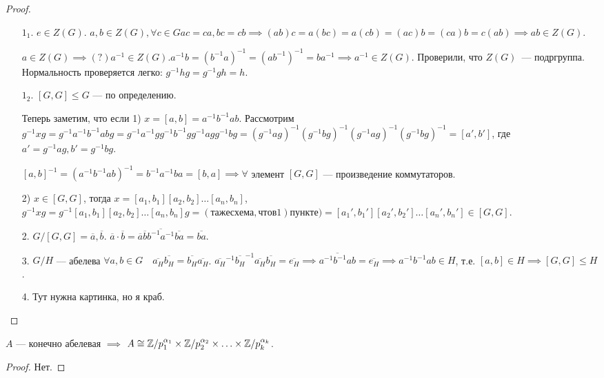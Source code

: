 \begin{proof}
    \begin{enumerate}
        \item[$1_1$.] $e \in Z(G)$.  $a, b \in Z(G), \forall c \in G ac = ca, bc = cb \implies (ab)c = a(bc) = a(cb) = (ac)b = (ca)b = c(ab) \implies ab \in Z(G)$.

            $a \in Z(G) \implies(?) a^{-1} \in Z(G). a^{-1}b = (b^{-1}a)^{-1} = (ab^{-1})^{-1} = ba^{-1} \implies a^{-1} \in Z(G)$. Проверили, что $Z(G)$~--- подргруппа. Нормальность проверяется легко: $g^{-1}hg = g^{-1}gh = h$.
        \item[$1_2$.] $[G, G] \le G$ --- по определению.

            Теперь заметим, что если 1) $x = [a, b] = a^{-1}b^{-1}ab$. Рассмотрим  $g^{-1}xg = g^{-1}a^{-1}b^{-1}abg = g^{-1}a^{-1}gg^{-1}b^{-1}gg^{-1}agg^{-1}bg = (g^{-1}ag)^{-1}(g^{-1}bg)^{-1}(g^{-1}ag)^{-1}(g^{-1}bg)^{-1} = [a', b']$, где $a' = g^{-1}ag, b' = g^{-1}bg$.

            $[a, b]^{-1} = (a^{-1}b^{-1}ab)^{-1} = b^{-1}a^{-1}ba = [b, a] \implies \forall $ элемент  $[G, G]$ --- произведение коммутаторов.

             2) $x \in [G, G]$, тогда  $x = [a_1, b_1][a_2,b_2]\ldots[a_n, b_n]$, $g^{-1}xg = g^{-1}[a_1, b_1][a_2, b_2]\ldots[a_n, b_n]g = (та же схема, что в 1) пункте) = [a_1', b_1'][a_2', b_2']\ldots[a_n', b_n'] \in [G, G]$.
         \item[2.] $G / [G, G] = \overline{a}, \overline{b}$.  $\overline{a} \cdot \overline{b} = \overline{a}\overline{b}\overline{b^{-1}a^{-1}}\overline{ba} = \overline{ba}$.
         \item[3.] $G / H$ --- абелева  $\forall a, b \in G\quad \overline{a_H} \overline{b_H} = \overline{b_H}\overline{a_H}$.  $\overline{a_H}^{-1}\overline{b_H}^{-1} \overline{a_H}\overline{b_H} = \overline{e_H} \implies \overline{a^{-1} b^{-1}ab} = \overline{e_H} \implies a^{-1}b^{-1}ab \in H$, т.е. $[a, b] \in H \implies [G, G] \le H$.
         \item[4.] Тут нужна картинка, но я краб.
    \end{enumerate}
\end{proof}
\begin{theorem}
    $A$ --- конечно абелевая  $\implies$  $A \cong \mathbb{Z} / p_1^{\alpha_1} \times \mathbb{Z} / p_2^{\alpha_2} \times \ldots \times \mathbb{Z} / p_k^{\alpha_k}$.
\end{theorem}
\begin{proof}
    Нет.
\end{proof}
